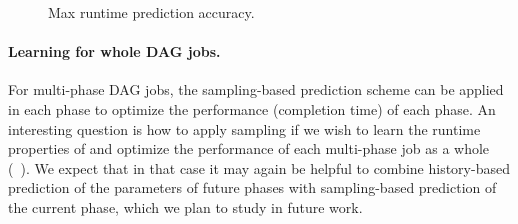 {

%
\begin{figure}[tp]
\centering
\vspace{-0.15in}
\hspace{-0.15in}
\vspace{-0.15in}
\caption{Max runtime prediction accuracy.}
\vspace{-0.15in}
\label{fig:sim:estimationAccuracy-max}
\end{figure}


\paragraph{Learning for whole DAG jobs.}
For multi-phase DAG jobs, the sampling-based prediction scheme can be
applied in each phase to optimize the performance (\eg completion
time) of each phase.  An interesting question is how to apply sampling
if we wish to learn the runtime 
properties of and optimize the performance of each multi-phase job {as a
  whole} (\eg~\cite{jockey:eurosys2012, AltruisticScheduling}).  We
expect that in that case it may again be helpful to combine
history-based prediction of the parameters of future phases with
sampling-based prediction of the current phase, which we plan to study
in future work.


}
